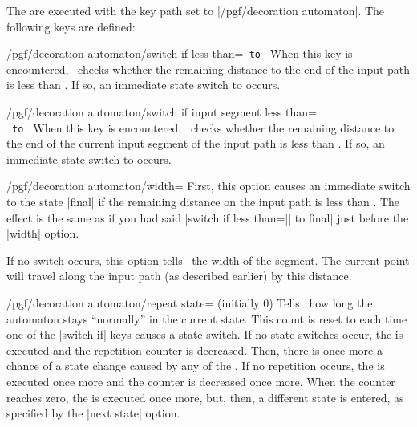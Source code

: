 \begin{command}{\pgfdeclaredecoration{}}
\begin{command}{\state{}}
        The  are executed with the key path set to
        |/pgf/decoration automaton|. The following keys are defined:
        \begin{key}{/pgf/decoration automaton/switch if less than=\texttt{ to }}
            When this key is encountered, \pgfname\ checks whether the
            remaining distance to the end of the input path is less than
            . If so, an immediate state switch to  occurs.
        \end{key}
        \begin{key}{/pgf/decoration automaton/switch if input segment less than=\\\texttt{ to }}
            When this key is encountered, \pgfname\ checks whether the
            remaining distance to the end of the current input segment of the
            input path is less than . If so, an immediate state
            switch to  occurs.
        \end{key}
        \begin{key}{/pgf/decoration automaton/width=}
            First, this option causes an immediate switch to the state |final|
            if the remaining distance on the input path is less than
            . The effect is the same as if you had said 
            |switch if less than=|| to final| just before the 
            |width| option.

            If no switch occurs, this option tells \pgfname\ the width of the
            segment. The current point will travel along the input path (as
            described earlier) by this distance.
        \end{key}
        \begin{key}{/pgf/decoration automaton/repeat state= (initially 0)}
            Tells \pgfname\ how long the automaton stays ``normally'' in the
            current state. This count is reset to  each time
            one of the |switch if| keys causes a state switch. If no state
            switches occur, the  is executed and the repetition
            counter is decreased. Then, there is once more a chance of a state
            change caused by any of the . If no repetition
            occurs, the  is executed once more and the counter is
            decreased once more. When the counter reaches zero, the 
            is executed once more, but, then, a different state is entered, as
            specified by the |next state| option.


\end{key}
\end{command}
\end{command}
